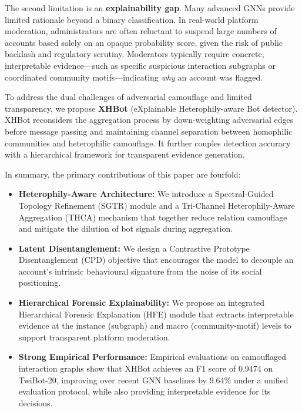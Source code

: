 The second limitation is an \textbf{explainability gap}. Many advanced GNNs provide limited rationale beyond a binary classification. In real-world platform moderation, administrators are often reluctant to suspend large numbers of accounts based solely on an opaque probability score, given the risk of public backlash and regulatory scrutiny. Moderators typically require concrete, interpretable evidence---such as specific suspicious interaction subgraphs or coordinated community motifs---indicating \textit{why} an account was flagged.

To address the dual challenges of adversarial camouflage and limited transparency, we propose \textbf{XHBot} (eXplainable Heterophily-aware Bot detector). XHBot reconsiders the aggregation process by down-weighting adversarial edges before message passing and maintaining channel separation between homophilic communities and heterophilic camouflage. It further couples detection accuracy with a hierarchical framework for transparent evidence generation.

In summary, the primary contributions of this paper are fourfold:
\begin{itemize}
    \item \textbf{Heterophily-Aware Architecture:} We introduce a Spectral-Guided Topology Refinement (SGTR) module and a Tri-Channel Heterophily-Aware Aggregation (THCA) mechanism that together reduce relation camouflage and mitigate the dilution of bot signals during aggregation.
    \item \textbf{Latent Disentanglement:} We design a Contrastive Prototype Disentanglement (CPD) objective that encourages the model to decouple an account's intrinsic behavioural signature from the noise of its social positioning.
    \item \textbf{Hierarchical Forensic Explainability:} We propose an integrated Hierarchical Forensic Explanation (HFE) module that extracts interpretable evidence at the instance (subgraph) and macro (community-motif) levels to support transparent platform moderation.
    \item \textbf{Strong Empirical Performance:} Empirical evaluations on camouflaged interaction graphs show that XHBot achieves an F1 score of 0.9474 on TwiBot-20, improving over recent GNN baselines by 9.64\% under a unified evaluation protocol, while also providing interpretable evidence for its decisions.
\end{itemize}